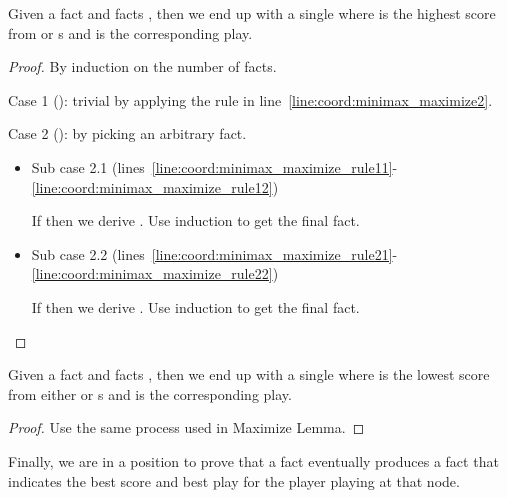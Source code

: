 \begin{lemma}
Given a fact  and  facts
, then we end up with a single
 where  is the
highest score from  or s and
 is the corresponding play.
\end{lemma}
\begin{proof}
By induction on the number of  facts.

Case 1 (): trivial by applying the rule in
line~\ref{line:coord:minimax_maximize2}.

Case 2 (): by picking an arbitrary  fact.

\begin{itemize}
   \item Sub case 2.1
      (lines~\ref{line:coord:minimax_maximize_rule11}-\ref{line:coord:minimax_maximize_rule12})

      If  then we derive . Use induction to get the final  fact.

   \item Sub case 2.2
      (lines~\ref{line:coord:minimax_maximize_rule21}-\ref{line:coord:minimax_maximize_rule22})

      If  then we derive . Use induction to get the final  fact.

\end{itemize}

\end{proof}

\begin{lemma}
Given a fact  and  facts
, then we end up with a single
 where  is the
lowest score from either  or s and
 is the corresponding play.
\end{lemma}
\begin{proof}
Use the same process used in Maximize Lemma.
\end{proof}

Finally, we are in a position to prove that a  fact eventually
produces a  fact that indicates the best score and best play for the
player playing at that node.

